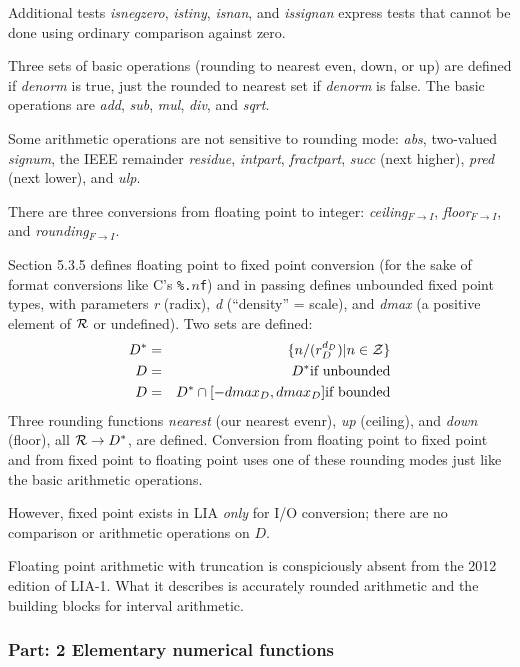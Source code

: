 \documentclass{article}
\begin{document}
Additional tests {\it isnegzero}\subF{}, {\it istiny}\subF{},
{\it isnan}\subF{}, and {\it issignan}\subF{} express tests that
cannot be done using ordinary comparison against zero.

Three sets of basic operations (rounding to nearest even, down,
or up) are defined if {\it denorm}\subF{} is true, just the
rounded to nearest set if {\it denorm}\subF{} is false.
The basic operations are {\it add}, {\it sub}, {\it mul},
{\it div}, and {\it sqrt}.

Some arithmetic operations are not sensitive to rounding
mode: {\it abs}\subF{}, two-valued {\it signum}\subF{},
the IEEE remainder {\it residue}\subF{}, {\it intpart}\subF{},
{\it fractpart}\subF{}, {\it succ}\subF{} (next higher),
{\it pred}\subF{} (next lower), and {\it ulp}\subF{}.

There are three conversions from floating point to integer:
{\it ceiling}${}_{F\rightarrow I}$,
{\it floor}${}_{F\rightarrow I}$, and
{\it rounding}${}_{F\rightarrow I}$.

Section 5.3.5 defines floating point to fixed point conversion
(for the sake of format conversions like C's {\tt \%.$n$f}) and in
passing defines unbounded fixed point types, with parameters
{\it r}\subD{} (radix), {\it d}\subD{} (``density'' = scale),
and {\it dmax}\subD{} (a positive element of $\cal R$ or
undefined).  Two sets are defined:
\begin{eqnarray*}
D^* &=& \{n/(r_D^{d_D}) | n \in {\cal Z}\}\\
D &=& D^* \mbox{if unbounded}\\
D &=& D^* \cap [-dmax_D,dmax_D] \mbox{if bounded}
\end{eqnarray*}
Three rounding functions {\it nearest}\subD{} (our nearest evenr),
{\it up}\subD{} (ceiling), and
{\it down}\subD{} (floor), all ${\cal R} \rightarrow D^*$, are
defined.  Conversion from floating point to fixed point and
from fixed point to floating point uses one of these rounding
modes just like the basic arithmetic operations.

However, fixed point exists in LIA {\it only} for I/O conversion;
there are no comparison or arithmetic operations on $D$.

Floating point arithmetic with truncation is conspiciously
absent from the 2012 edition of LIA-1.  What it describes is
accurately rounded arithmetic and the building blocks for
interval arithmetic.

\subsubsection{Part: 2 Elementary numerical functions}
\end{document}
